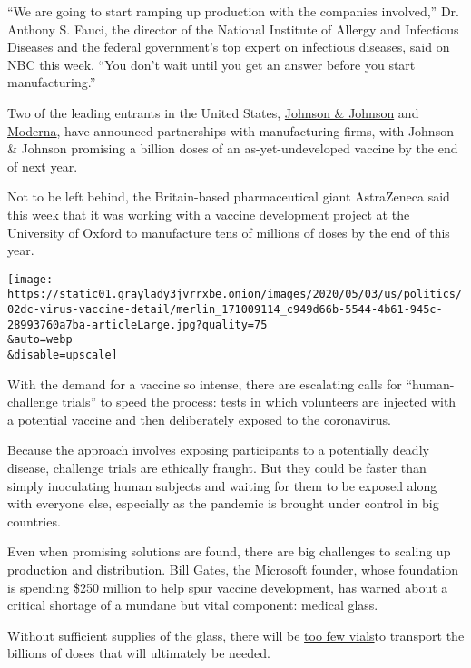 ``We are going to start ramping up production with the companies
involved,'' Dr. Anthony S. Fauci, the director of the National Institute
of Allergy and Infectious Diseases and the federal government's top
expert on infectious diseases, said on NBC this week. ``You don't wait
until you get an answer before you start manufacturing.''

Two of the leading entrants in the United States,
\href{https://www.nytimes3xbfgragh.onion/2020/05/19/business/johnson-baby-powder-sales-stopped.html}{Johnson
\& Johnson} and
\href{https://www.nytimes3xbfgragh.onion/2020/05/18/health/coronavirus-vaccine-moderna.html}{Moderna},
have announced partnerships with manufacturing firms, with Johnson \&
Johnson promising a billion doses of an as-yet-undeveloped vaccine by
the end of next year.

Not to be left behind, the Britain-based pharmaceutical giant
AstraZeneca said this week that it was working with a vaccine
development project at the University of Oxford to manufacture tens of
millions of doses by the end of this year.

\texttt{[image: https://static01.graylady3jvrrxbe.onion/images/2020/05/03/us/politics/02dc-virus-vaccine-detail/merlin\_171009114\_c949d66b-5544-4b61-945c-28993760a7ba-articleLarge.jpg?quality=75\\\&auto=webp\\\&disable=upscale]}

With the demand for a vaccine so intense, there are escalating calls for
``human-challenge trials'' to speed the process: tests in which
volunteers are injected with a potential vaccine and then deliberately
exposed to the coronavirus.

Because the approach involves exposing participants to a potentially
deadly disease, challenge trials are ethically fraught. But they could
be faster than simply inoculating human subjects and waiting for them to
be exposed along with everyone else, especially as the pandemic is
brought under control in big countries.

Even when promising solutions are found, there are big challenges to
scaling up production and distribution. Bill Gates, the Microsoft
founder, whose foundation is spending \$250 million to help spur vaccine
development, has warned about a critical shortage of a mundane but vital
component: medical glass.

Without sufficient supplies of the glass, there will be
\href{https://www.nytimes3xbfgragh.onion/2020/05/01/health/coronavirus-vaccine-supplies.html}{too
few vials}to transport the billions of doses that will ultimately be
needed.

